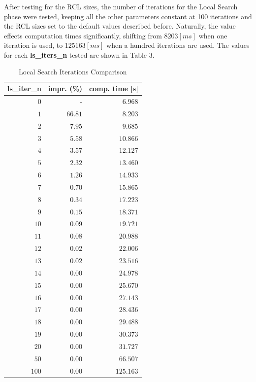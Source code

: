 After testing for the RCL sizes, the number of iterations for the Local Search phase were tested, keeping all the other parameters constant at 100 iterations and the RCL sizes set to the default values described before. Naturally, the value effects computation times significantly, shifting from $8203 [ms]$ when one iteration is used, to $125163 [ms]$ when a hundred iterations are used. The values for each \textbf{ls\_iters\_n} tested are shown in Table 3.

\begin{center}
    \begin{table}[]
    \centering
    \begin{tabular}{|r|r|r|}
        \hline
        \textbf{ls\_iter\_n} & impr. (\%) & comp. time [s] \\
        \hline
        $0$   & -       &   $6.968$ \\
        $1$   & $66.81$ &   $8.203$ \\
        $2$   & $7.95$  &   $9.685$ \\
        $3$   & $5.58$  &  $10.866$ \\
        $4$   & $3.57$  &  $12.127$ \\
        $5$   & $2.32$  &  $13.460$ \\
        $6$   & $1.26$  &  $14.933$ \\
        $7$   & $0.70$  &  $15.865$ \\
        $8$   & $0.34$  &  $17.223$ \\
        $9$   & $0.15$  &  $18.371$ \\
        $10$  & $0.09$  &  $19.721$ \\
        $11$  & $0.08$  &  $20.988$ \\
        $12$  & $0.02$  &  $22.006$ \\
        $13$  & $0.02$  &  $23.516$ \\
        $14$  & $0.00$  &  $24.978$ \\
        $15$  & $0.00$  &  $25.670$ \\
        $16$  & $0.00$  &  $27.143$ \\
        $17$  & $0.00$  &  $28.436$ \\
        $18$  & $0.00$  &  $29.488$ \\
        $19$  & $0.00$  &  $30.373$ \\
        $20$  & $0.00$  &  $31.727$ \\
        $50$  & $0.00$  &  $66.507$ \\
        $100$ & $0.00$  & $125.163$ \\
        \hline
    \end{tabular}
    \caption{Local Search Iterations Comparison}
    \label{ls\_iter\_n comparison}
    \end{table}
\end{center}

